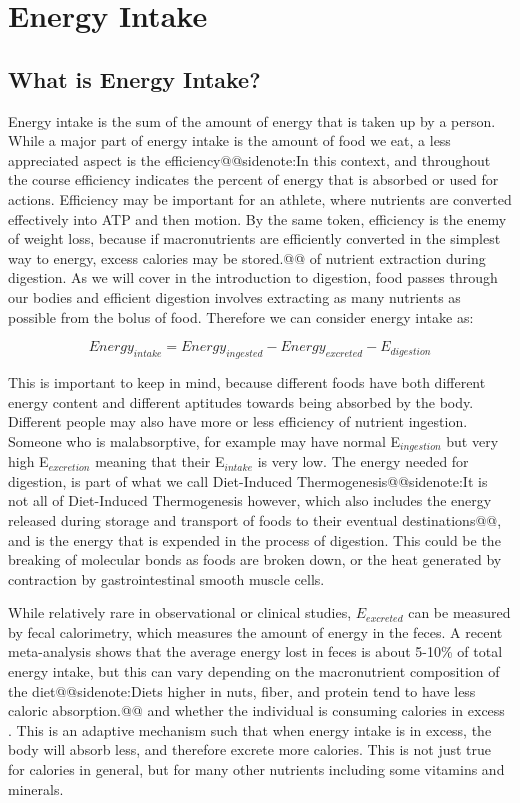 \documentclass{tufte-handout}
\makeatletter
\def\sidenote#1{@@sidenote:#1@@}
\makeatother
\begin{document}
\section{Energy Intake}

\subsection{What is Energy Intake?}
Energy intake is the sum of the amount of energy that is taken up by a person.  While a major part of energy intake is the amount of food we eat, a less appreciated aspect is the efficiency\sidenote{In this context, and throughout the course efficiency indicates the percent of energy that is absorbed or used for actions.  Efficiency may be important for an athlete, where nutrients are converted effectively into ATP and then motion.  By the same token, efficiency is the enemy of weight loss, because if macronutrients are efficiently converted in the simplest way to energy, excess calories may be stored.} of nutrient extraction during digestion.  As we will cover in the introduction to digestion, food passes through our bodies and efficient digestion involves extracting as many nutrients as possible from the bolus of food.  Therefore we can consider energy intake as:

\begin{equation}
Energy_{intake} = Energy_{ingested} - Energy_{excreted} - E_{digestion}
\end{equation}

This is important to keep in mind, because different foods have both different energy content and different aptitudes towards being absorbed by the body.  Different people may also have more or less efficiency of nutrient ingestion.  Someone who is malabsorptive, for example may have normal E$_{ingestion}$ but very high E$_{excretion}$ meaning that their E$_{intake}$ is very low.  The energy needed for digestion, is part of what we call Diet-Induced Thermogenesis\sidenote{It is not all of Diet-Induced Thermogenesis however, which also includes the energy released during storage and transport of foods to their eventual destinations}, and is the energy that is expended in the process of digestion.  This could be the breaking of molecular bonds as foods are broken down, or the heat generated by contraction by gastrointestinal smooth muscle cells.

While relatively rare in observational or clinical studies, $E_{excreted}$ can be measured by fecal calorimetry, which measures the amount of energy in the feces.  A recent meta-analysis shows that the average energy lost in feces is about 5-10\% of total energy intake, but this can vary  depending on the macronutrient composition of the diet\sidenote{Diets higher in nuts, fiber, and protein tend to have less caloric absorption.} and whether the individual is consuming calories in excess \citep{yoshimuraDigestibleMetabolizableEnergy2026}.  This is an adaptive mechanism such that when energy intake is in excess, the body will absorb less, and therefore excrete more calories.  This is not just true for calories in general, but for many other nutrients including some vitamins and minerals.
\end{document}
